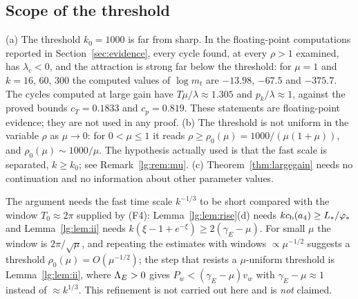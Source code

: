 \subsection{Scope of the threshold}\label{lg:sec:scope}
\begin{remark}\label{lg:rem:scope}
\textup{(a)} The threshold $k_0=1000$ is far from sharp. In the floating-point computations reported in Section~\ref{sec:evidence}, every cycle found, at every $\rho>1$ examined, has $\lambda_c<0$, and the attraction is strong far below the threshold: for $\mu=1$ and $k=16$, $60$, $300$ the computed values of $\log m_t$ are $-13.98$, $-67.5$ and $-375.7$. The cycles computed at large gain have $T\mu/\lambda\approx1.305$ and $p_k/\lambda\approx1$, against the proved bounds $c_T=0.1833$ and $c_p=0.819$. These statements are floating-point evidence; they are not used in any proof.
\textup{(b)} The threshold is not uniform in the variable $\rho$ as $\mu\to0$: for $0<\mu\le1$ it reads $\rho\ge\rho_0(\mu)=1000/(\mu(1+\mu))$, and $\rho_0(\mu)\sim1000/\mu$. The hypothesis actually
used is that the fast scale is separated, $k\ge k_0$; see Remark~\ref{lg:rem:mu}.
\textup{(c)} Theorem~\ref{thm:largegain} needs no continuation and no information about other parameter values.
\end{remark}

\begin{remark}\label{lg:rem:mu}
The argument needs the fast time scale $k^{-1/3}$ to be short compared with the window
$T_0\approx2\pi$ supplied by (F4): Lemma~\ref{lg:lem:rise}(d) needs $kc_{\rm b}(a_4)\ge L_\ast/\varphi_\ast$ and
Lemma~\ref{lg:lem:ii} needs $k(\xi-1+e^{-\xi})\ge2(\gamma_E-\mu)$. For small $\mu$ the window is
$2\pi/\sqrt\mu$, and repeating the estimates with windows $\propto\mu^{-1/2}$ suggests a threshold
$\rho_0(\mu)=O(\mu^{-1/2})$; the step that resists a $\mu$-uniform threshold is Lemma~\ref{lg:lem:ii}, where
$\Lambda_E>0$ gives $P_w<(\gamma_E-\mu)v_w$ with $\gamma_E-\mu\approx1$ instead of $\approx k^{1/3}$.
This refinement is not carried out here and is \emph{not} claimed.
\end{remark}
